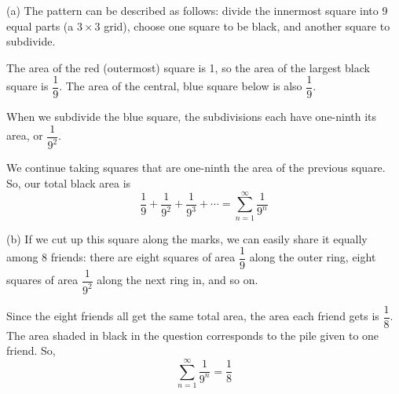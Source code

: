 \begin{solution}
(a) The pattern can be described as follows: divide the innermost square into 9 equal parts (a $3\times 3$ grid), choose one square to be black, and another square to subdivide.

The area of the red (outermost) square is 1, so the area of the largest black square is $\dfrac19$. The area of the central, blue square below is also $\dfrac19$.
\begin{center}
\end{center}
When we subdivide the blue square, the subdivisions each have one-ninth its area, or $\dfrac{1}{9^2}$.
\begin{center}
\end{center}

We continue taking squares that are one-ninth the area of the previous square. So, our total black area is
\[\frac{1}{9}+\frac{1}{9^2}+\frac{1}{9^3}+\cdots = \sum_{n=1}^\infty \frac{1}{9^n}\]

(b) If we cut up this square along the marks, we can easily share it equally among 8 friends: there are eight squares of area $\dfrac19$ along the outer ring,
eight squares of area $\dfrac1{9^2}$ along the next ring in, and so on.

\begin{center}
\end{center}

Since the eight friends all get the same total area, the area each friend gets is $\dfrac{1}{8}$. The area shaded in black in the question corresponds to the pile given to one friend. So,
\[\sum_{n=1}^\infty \frac{1}{9^n}=\frac18\]
\end{solution}



